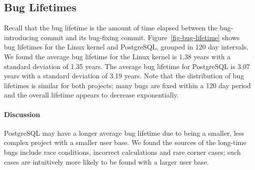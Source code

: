 \subsection{Bug Lifetimes}
\label{sec-bug-lifetime}

Recall that the bug lifetime is the amount of time elapsed between the
bug-introducing commit and its bug-fixing commit. Figure~\ref{fig-bug-lifetime}
shows bug lifetimes for the Linux kernel and PostgreSQL, 
grouped in 120 day intervals. We found the average bug lifetime for the Linux
kernel is 1.38 years with a standard deviation of 1.35 years. The average bug
lifetime for PostgreSQL is 3.07 years with a standard deviation of 3.19
years. Note that the distribution of bug lifetimes is similar for both projects;
many bugs are fixed within a 120 day period and the overall lifetime appears to
decrease exponentially.

\paragraph{Discussion}

PostgreSQL may have a longer average bug lifetime due to being a smaller, less
complex project with a smaller user base. We found the sources of the long-time
bugs include race conditions, incorrect calculations and rare corner cases; such
cases are intuitively more likely to be found with a larger user base.

